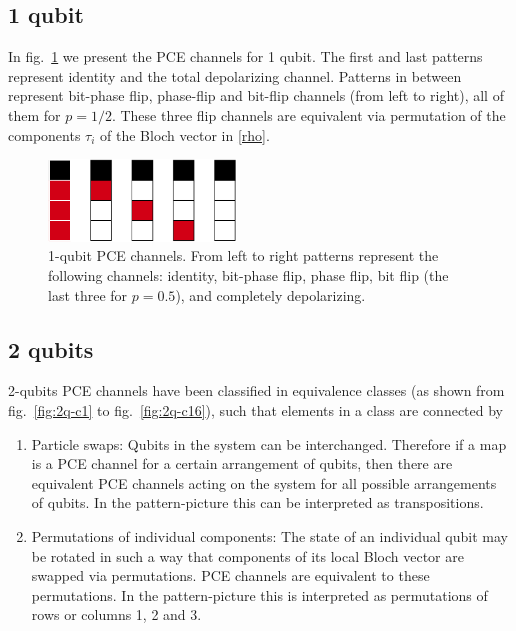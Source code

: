 \documentclass[11pt,dvipsnames]{article} %
\newcommand{\fref}[1]{fig.~\ref{#1}}  \newcommand{\tref}[1]{table~\ref{#1}}
\newcommand{\1}{\mathds{1}}
\begin{document}
\subsection*{1 qubit} %
In \fref{fig:1q-ccs} we present the PCE channels for 1 qubit.
The first and last patterns represent identity 
and the total depolarizing channel. 
Patterns in between represent 
bit-phase flip, phase-flip and bit-flip channels (from left to right), 
all of them for $p=1/2$.	
These three flip channels are equivalent via permutation
of the components $\tau_i$ of the Bloch vector in \eqref{rho}.
\begin{figure}[H]%
	\centering
	\includegraphics[width=5cm]
	{img/1q-CCs.png}
	\caption{
 
1-qubit PCE channels. From left to right patterns represent  
the following channels: identity,
bit-phase flip, phase flip, bit flip (the last three for 
$p=0.5$), and completely depolarizing.}
	\label{fig:1q-ccs}
\end{figure} %
\subsection*{2 qubits} %
2-qubits PCE channels have been classified in equivalence classes 
(as shown from \fref{fig:2q-c1} to \fref{fig:2q-c16}), such
that elements in a class are connected by
\begin{enumerate}
	\item Particle swaps: Qubits in the system can be interchanged. Therefore
	if a map is a PCE channel for a certain arrangement 
	of qubits, then
	there are equivalent PCE channels acting on the system for all possible
	arrangements of qubits. In the pattern-picture this can be
	interpreted as transpositions.
	\item Permutations of individual components: The state of an individual
	qubit may be rotated in such a way that components of its local Bloch
	vector are swapped via permutations. PCE channels are equivalent
	to these permutations.
	In the pattern-picture this
	is interpreted as permutations of rows or columns 1, 2 and 3.
\end{enumerate}
\end{document}
